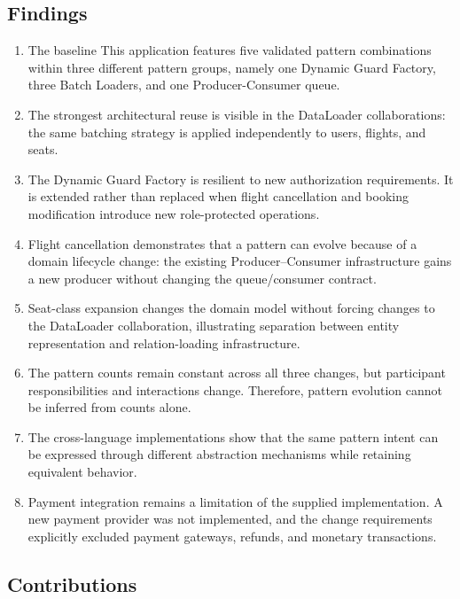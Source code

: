 \documentclass[11pt,a4paper]{article}
\begin{document}
\subsection{Findings}
\begin{enumerate}[leftmargin=*]
\item The baseline This application features five validated pattern combinations within three different pattern groups, namely one Dynamic Guard Factory, three Batch Loaders, and one Producer-Consumer queue.
\item The strongest architectural reuse is visible in the DataLoader collaborations: the same batching strategy is applied independently to users, flights, and seats.
\item The Dynamic Guard Factory is resilient to new authorization requirements. It is extended rather than replaced when flight cancellation and booking modification introduce new role-protected operations.
\item Flight cancellation demonstrates that a pattern can evolve because of a domain lifecycle change: the existing Producer--Consumer infrastructure gains a new producer without changing the queue/consumer contract.
\item Seat-class expansion changes the domain model without forcing changes to the DataLoader collaboration, illustrating separation between entity representation and relation-loading infrastructure.
\item The pattern counts remain constant across all three changes, but participant responsibilities and interactions change. Therefore, pattern evolution cannot be inferred from counts alone.
\item The cross-language implementations show that the same pattern intent can be expressed through different abstraction mechanisms while retaining equivalent behavior.
\item Payment integration remains a limitation of the supplied implementation. A new payment provider was not implemented, and the change requirements explicitly excluded payment gateways, refunds, and monetary transactions.
\end{enumerate}

\subsection{Contributions}
\end{document}
